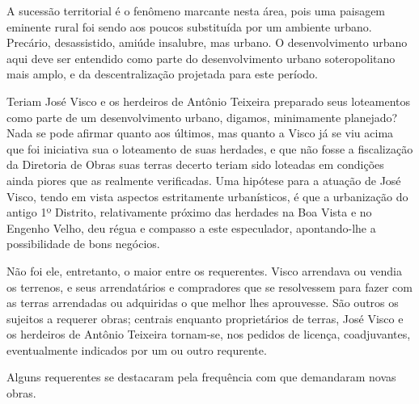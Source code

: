 
A sucessão territorial é o fenômeno marcante nesta área, pois uma paisagem eminente rural foi sendo aos poucos substituída por um ambiente urbano. Precário, desassistido, amiúde insalubre, mas urbano. O desenvolvimento urbano aqui deve ser entendido como parte do desenvolvimento urbano soteropolitano mais amplo, e da descentralização projetada para este período.


Teriam José Visco e os herdeiros de Antônio Teixeira preparado seus loteamentos como parte de um desenvolvimento urbano, digamos, minimamente planejado? Nada se pode afirmar quanto aos últimos, mas quanto a Visco já se viu acima que foi iniciativa sua o loteamento de suas herdades, e que não fosse a fiscalização da Diretoria de Obras suas terras decerto teriam sido loteadas em condições ainda piores que as realmente verificadas. Uma hipótese para a atuação de José Visco, tendo em vista aspectos estritamente urbanísticos, é que a urbanização do antigo 1º Distrito, relativamente próximo das herdades na Boa Vista e no Engenho Velho, deu régua e compasso a este especulador, apontando-lhe a possibilidade de bons negócios.


Não foi ele, entretanto, o maior entre os requerentes. Visco arrendava ou vendia os terrenos, e seus arrendatários e compradores que se resolvessem para fazer com as terras arrendadas ou adquiridas o que melhor lhes aprouvesse. São outros os sujeitos a requerer obras; centrais enquanto proprietários de terras, José Visco e os herdeiros de Antônio Teixeira tornam-se, nos pedidos de licença, coadjuvantes, eventualmente indicados por um ou outro requrente.

Alguns requerentes se destacaram pela frequência com que demandaram novas obras.

